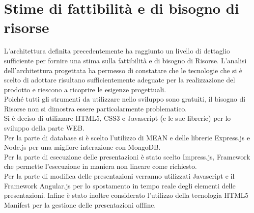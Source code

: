 \section{Stime di fattibilità e di bisogno di risorse}{
	L'architettura definita precedentemente ha raggiunto un livello di dettaglio sufficiente per fornire una stima sulla fattibilità e di bisogno di Risorse. L'analisi dell'architettura progettata ha permesso di constatare che le tecnologie che si è scelto di adottare risultano sufficientemente adeguate per la realizzazione del prodotto e riescono a ricoprire le esigenze progettuali.\\
	Poiché tutti gli strumenti da utilizzare nello sviluppo sono gratuiti, il bisogno di
	Risorse non si dimostra essere particolarmente problematico.\\
	Si è deciso di utilizzare HTML5, CSS3 e Javascript (e le sue librerie) per lo sviluppo della parte WEB.\\
	Per la parte di database si è scelto l'utilizzo di MEAN e delle librerie Express.js e Node.js per una migliore interazione con MongoDB.\\
	Per la parte di esecuzione delle presentazioni è stato scelto Impress.js, Framework che permette l'esecuzione in maniera non lineare come richiesto.\\
	Per la parte di modifica delle presentazioni verranno utilizzati Javascript e il Framework Angular.js per lo spostamento in tempo reale degli elementi delle presentazioni.
	Infine è stato inoltre considerato l'utilizzo della tecnologia HTML5 Manifest per la gestione delle presentazioni offline.
	}